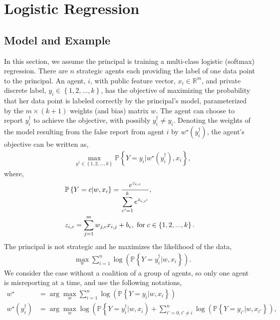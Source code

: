 \documentclass{article}
\begin{document}
\section{Logistic Regression} 

\subsection{Model and Example}
In this section, we assume the principal is training a multi-class logistic (softmax) regression. There are $n $ strategic agents each providing the label of one data point to the principal. An agent, $i $, with public feature vector, $x_{i} \in \mathbb{R}^{m}$, and private discrete label, $y_{i} \in \left\{1, 2, ..., k \right\}$, has the objective of maximizing the probability that her data point is labeled correctly by the principal's model, parameterized by the $m  \times \left(k  + 1\right)$ weights (and bias) matrix $w $. The agent can choose to report $y^{\dagger}_{i}$ to achieve the objective, with possibly $y^{\dagger}_{i} \neq  y_{i}$. Denoting the weights of the model resulting from the false report from agent $i $ by $w^\star \left(y^{\dagger}_{i}\right)$, the agent's objective can be written as,
\begin{align*}
&  \displaystyle\max_{y^{\dagger} \in \left\{1, 2, ..., k \right\}} \mathbb{P}\left\{Y = y_{i} | w^\star \left(y^{\dagger}_{i}\right), x_{i}\right\},
\end{align*}
where,
\begin{align*}
&  \mathbb{P}\left\{Y = c | w, x_{i}\right\} = \dfrac{e^{z_{i,c}}}{\displaystyle\sum_{c'=1}^{k} e^{z_{i,c'}}},
\\ &  z_{i,c} = \displaystyle\sum_{j=1}^{m} w_{j,c} x_{i,j} + b_{c} , \text{\;for\;} c \in \left\{1, 2, ..., k\right\}.
\end{align*}
The principal is not strategic and he maximizes the likelihood of the data,
\begin{align*}
&\displaystyle\max_{w} \displaystyle\sum_{i=1}^{n} \log\left(\mathbb{P}\left\{Y = y^{\dagger}_{i} | w, x_{i}\right\}\right).
\end{align*}
We consider the case without a coalition of a group of agents, so only one agent is misreporting at a time, and use the following notations,
\begin{align*}
w^\star  &= \arg\displaystyle\max_{w} \displaystyle\sum_{i=1}^{n} \log\left(\mathbb{P}\left\{Y = y_{i} | w, x_{i}\right\}\right)
\\ w^\star \left(y^{\dagger}_{i}\right) &= \arg\displaystyle\max_{w} \log\left(\mathbb{P}\left\{Y = y^{\dagger}_{i} | w, x_{i}\right) + \displaystyle\sum_{i' = 0, i' \neq  i}^{n} \log\left(\mathbb{P}\left\{Y = y_{i'} | w, x_{i'}\right\}\right),\right.
\end{align*}
\end{document}

